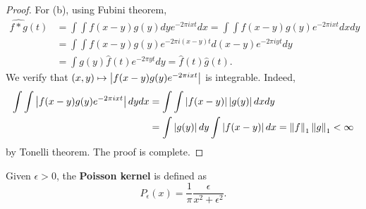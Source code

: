 \begin{proof}
    For (b), using Fubini theorem,
    \begin{equation*}
        \begin{split}
            \widehat{f*g}(t) &= \int\int f(x-y)g(y)dy e^{-2\pi ixt}dx 
            = \int\int f(x-y)g(y)e^{-2\pi ixt}dxdy \\
            &= \int\int f(x-y)g(y)e^{-2\pi i(x-y)t}d(x-y)e^{-2\pi iyt}dy \\
            &= \int g(y)\hat{f}(t)e^{-2\pi yt}dy = \hat{f}(t)\hat{g}(t).
        \end{split}
    \end{equation*}
    We verify that $(x,y)\mapsto\left\lvert {f(x-y)g(y)e^{-2\pi ixt}} \right\rvert$ is integrable. 
    Indeed, 
    \begin{equation*}
        \begin{split}
            \int\int \left\lvert {f(x-y)g(y)e^{-2\pi ixt}} \right\rvert dydx 
            &= \int\int \left\lvert {f(x-y)} \right\rvert\left\lvert {g(y)} \right\rvert dxdy \\
            &= \int\left\lvert {g(y)} \right\rvert dy\int\left\lvert {f(x-y)} \right\rvert dx 
            = \left\lVert {f} \right\rVert_1\left\lVert {g} \right\rVert_1 < \infty
        \end{split}
    \end{equation*}
    by Tonelli theorem. The proof is complete.
\end{proof}

\begin{definition}
    Given $\epsilon>0$, the \textbf{Poisson kernel} is defined as 
    \begin{equation*}
        P_\epsilon(x) = \frac{1}{\pi}\frac{\epsilon}{x^2+\epsilon^2}.
    \end{equation*}
\end{definition}

